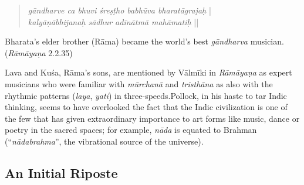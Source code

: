 \begin{quote}
\textsl{gāndharve ca bhuvi śreṣṭho babhūva bharatāgrajaḥ} |\\
\textsl{kalyāṇābhijanaḥ sādhur adīnātmā mahāmatiḥ} ||
\end{quote}

\begin{myquote}
Bharata’s elder brother (Rāma) became the world’s best \textsl{gāndharva} musician. 
\hfill(\textsl{Rāmāyaṇa} 2.2.35)
\end{myquote}

\newpage

Lava and Kuśa, Rāma’s sons, are mentioned by Vālmīki in \textsl{Rāmāyaṇa} as expert musicians who were familiar with \textsl{mūrchanā} and \textsl{tristhāna} as also with the rhythmic patterns (\textsl{laya}, \textsl{yati}) in three-speeds.Pollock, in his haste to tar Indic thinking, seems to have overlooked the fact that the Indic civilization is one of the few that has given extraordinary importance to art forms like music, dance or poetry in the sacred spaces; for example, \textsl{nāda} is equated to Brahman (``\textsl{nādabrahma}'', the vibrational source of the universe).\\[-20pt]

\subsection{An Initial Riposte}\label{chap3-sec1.1}

